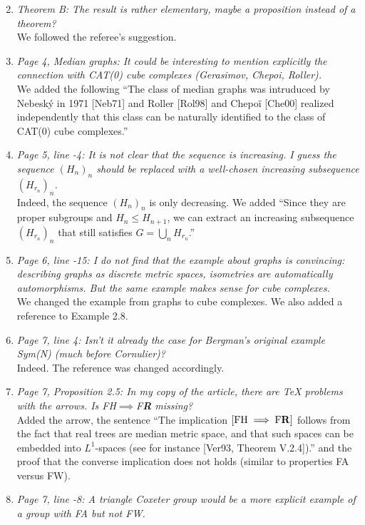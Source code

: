 \documentclass[english,a4paper]{article}
\newcommand*{\FH}{FH}
\newcommand*{\FW}{FW}
\newcommand*{\FA}{FA}
\newcommand*{\FR}{F\textbf{R}}
\begin{document}
\begin{enumerate}
%
\setcounter{enumi}{1}
\item\textit{Theorem B: The result is rather elementary, maybe a proposition instead of a theorem?}\\
We followed the referee's suggestion.
%
\item\textit{Page 4, Median graphs: It could be interesting to mention explicitly the connection with CAT(0) cube complexes (Gerasimov, Chepoi, Roller).}\\
We added the following ``The class of median graphs was intruduced by Nebesk\'y in 1971 [Neb71] and  Roller [Rol98] and Chepoï [Che00] realized independently that this class can be naturally identified to the class of CAT(0) cube complexes.''
%
\item\textit{Page 5, line -4: It is not clear that the sequence is increasing. I guess the sequence $(H_n)_n$ should be replaced with a well-chosen increasing subsequence $(H_{r_n})_n$.
}\\
Indeed, the sequence $(H_n)_n$ is only decreasing. We added ``Since they are proper subgroups and $H_n\leq H_{n+1}$, we can extract an increasing subsequence $(H_{r_n})_n$ that still satisfies $G=\bigcup_n H_{r_n}$.''
%
\item\textit{Page 6, line -15: I do not find that the example about graphs is convincing: describing graphs as discrete metric spaces, isometries are automatically automorphisms. But the same example makes sense for cube complexes.}\\
We changed the example from graphs to cube complexes. We also added a reference to Example 2.8.
%
\item\textit{Page 7, line 4: Isn’t it already the case for Bergman’s original example Sym(N) (much before Cornulier)?}\\
Indeed. The reference was changed accordingly.
%
\item\textit{Page 7, Proposition 2.5: In my copy of the article, there are TeX problems with the arrows. Is \FH$\implies$\FR{} missing?}\\
Added the arrow, the sentence ``The implication $[\textnormal{\FH}\implies \textnormal{\FR}]$ follows from the fact that real trees are median metric space, and that such spaces can be embedded into $L^1$-spaces (see for instance [Ver93, Theorem V.2.4]).'' and the proof that the converse implication does not holds (similar to properties \FA{} versus \FW).
%
\item\textit{Page 7, line -8: A triangle Coxeter group would be a more explicit example of a group with FA but not FW.}\\

\end{enumerate}
\end{document}
